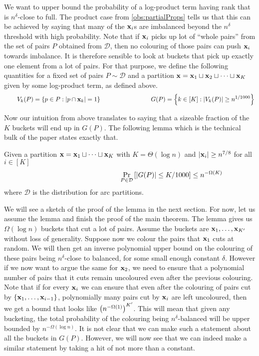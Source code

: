 We want to upper bound the probability of a log-product term having rank that is $n^{\delta}$-close to full. The product case from \autoref{obs:partialProps} tells us that this can be achieved by saying that many of the $\mathbf{x}_i$s are imbalanced beyond the $n^{\delta}$ threshold with high probability. Note that if $\mathbf{x}_i$ picks up lot of ``whole pairs'' from the set of pairs $P$ obtained from $\mathcal{D}$, then no colouring of those pairs can push $\mathbf{x}_i$ towards imbalance. It is therefore sensible to look at buckets that pick up exactly one element from a lot of pairs. For that purpose, we define the following quantities for a fixed set of pairs $P \sim \mathcal{D}$ and a partition $\mathbf{x} = \mathbf{x}_1 \sqcup \mathbf{x}_2 \sqcup \cdots \sqcup \mathbf{x}_K$ given by some log-product term, as defined above.
\[
	\qquad V_k(P) = \left\{ p \in P : \left| p \cap \mathbf{x}_k \right| = 1 \right\}
	\qquad \qquad \qquad \qquad 
	G(P) = \left\{ k \in [K] : \left| V_k(P) \right| \geq n^{1/1000} \right\}
\]

Now our intuition from above translates to saying that a sizeable fraction of the $K$ buckets will end up in $G(P)$. The following lemma which is the technical bulk of the paper states exactly that.

\begin{lemma}
\label{lem:manyBucketsWithCuts}
Given a partition $\mathbf{x} = \mathbf{x}_1 \sqcup \cdots \sqcup \mathbf{x}_K$ with $K = \Theta(\log n)$ and $\left|\mathbf{x}_i\right| \geq n^{7/8}$ for all $i \in [K]$
\[
	\qquad \qquad \qquad \qquad \qquad \qquad \Pr_{P \in \mathcal{D}} \left[ \left|G(P)\right| \leq K/1000 \right] \leq n^{- \Omega(K)}
\]
where $\mathcal{D}$ is the distribution for arc partitions.
\end{lemma}

We will see a sketch of the proof of the lemma in the next section. For now, let us assume the lemma and finish the proof of the main theorem. The lemma gives us $\Omega(\log n)$ buckets that cut a lot of pairs. Assume the buckets are $\mathbf{x}_1,\ldots,\mathbf{x}_{K'}$ without loss of generality. Suppose now we colour the pairs that $\mathbf{x}_1$ cuts at random. We will then get an inverse polynomial upper bound on the colouring of these pairs being $n^{\delta}$-close to balanced, for some small enough constant $\delta$. However if we now want to argue the same for $\mathbf{x}_2$, we need to ensure that a polynomial number of pairs that it cuts remain uncoloured even after the previous colouring. Note that if for every $\mathbf{x}_i$ we can ensure that even after the colouring of pairs cut by $\left\{\mathbf{x}_1,\ldots,\mathbf{x}_{i-1}\right\}$, polynomially many pairs cut by $\mathbf{x}_i$ are left uncoloured, then we get a bound that looks like $\left(n^{-\Omega(1)}\right)^{K'}$. This will mean that given any bucketing, the total probability of the colouring being $n^{\delta}$-balanced will be upper bounded by $n^{-\Omega(\log n)}$. It is not clear that we can make such a statement about all the buckets in $G(P)$. However, we will now see that we can indeed make a similar statement by taking a hit of not more than a constant.

